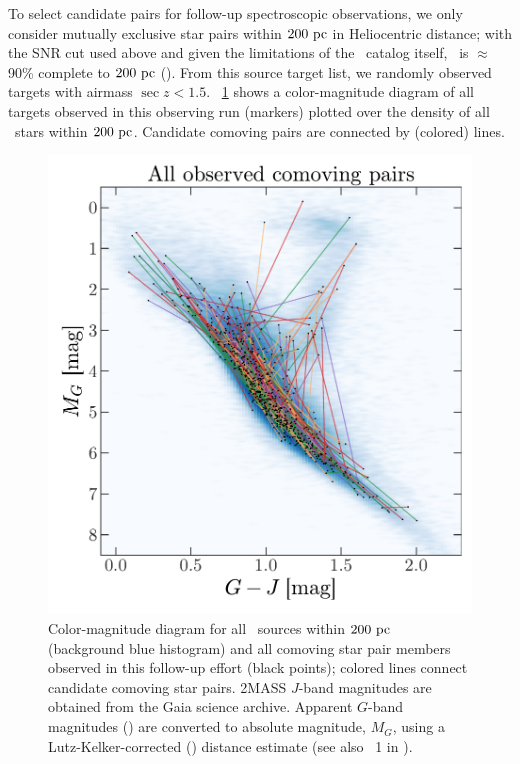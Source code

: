 \documentclass[modern, letterpaper]{aastex61}
\newcommand{\tgas}{\acronym{TGAS}}
\begin{document}
To select candidate pairs for follow-up spectroscopic observations, we only
consider mutually exclusive star pairs within $200~\mathrm{pc}$ in Heliocentric
distance; with the SNR cut used above and given the limitations of the \tgas\
catalog itself, \tgas\ is $\approx$90\% complete to $200~\mathrm{pc}$
(\citealt{Bovy:2017}).
From this source target list, we randomly observed targets with airmass $\sec z
< 1.5$.
\figurename~\ref{fig:sample-cmd} shows a color-magnitude diagram of all targets
observed in this observing run (markers) plotted over the density of all \tgas\
stars within $200~\mathrm{pc}$.
Candidate comoving pairs are connected by (colored) lines.

\begin{figure}[htbp]
  \begin{center}
    \includegraphics[width=\linewidth]{sample_cmd.pdf}
  \end{center}
  \caption{%
    Color-magnitude diagram for all \tgas\ sources within $200~\mathrm{pc}$ (background
    blue histogram) and all comoving star pair members observed in this
    follow-up effort (black points); colored lines connect candidate comoving
    star pairs.
    2MASS $J$-band magnitudes are obtained from the Gaia science
    archive.
    Apparent $G$-band magnitudes (\citealt{Carrasco:2016}) are converted to
    absolute magnitude, $M_G$, using a Lutz-Kelker-corrected
    (\citealt{Lutz:1973}) distance estimate (see also \eqname~1 in
    \citealt{Oh:2017}).
    \label{fig:sample-cmd}}
\end{figure}
\end{document}
